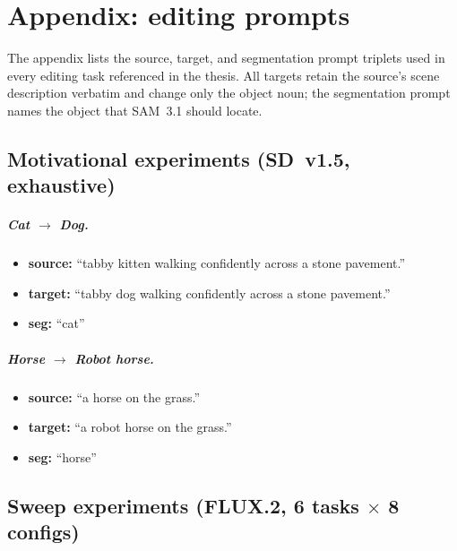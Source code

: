 \chapter*{Appendix: editing prompts}

The appendix lists the source, target, and segmentation prompt triplets used in every editing task referenced in the thesis. All targets retain the source's scene description verbatim and change only the object noun; the segmentation prompt names the object that SAM~3.1 should locate.

\section*{Motivational experiments (SD~v1.5, exhaustive)}

\paragraph{Cat $\to$ Dog.}
\begin{itemize}
    \item \textbf{source:} ``tabby kitten walking confidently across a stone pavement.''
    \item \textbf{target:} ``tabby dog walking confidently across a stone pavement.''
    \item \textbf{seg:} ``cat''
\end{itemize}

\paragraph{Horse $\to$ Robot horse.}
\begin{itemize}
    \item \textbf{source:} ``a horse on the grass.''
    \item \textbf{target:} ``a robot horse on the grass.''
    \item \textbf{seg:} ``horse''
\end{itemize}

\section*{Sweep experiments (FLUX.2, 6 tasks $\times$ 8 configs)}

